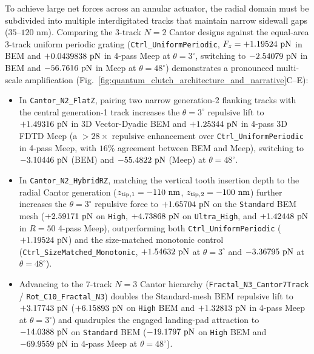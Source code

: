 \documentclass[11pt,letterpaper]{article}
\begin{document}
To achieve large net forces across an annular actuator, the radial domain must be subdivided into multiple interdigitated tracks that maintain narrow sidewall gaps ($35\text{--}120\text{ nm}$). Comparing the 3-track $N=2$ Cantor designs against the equal-area 3-track uniform periodic grating (\texttt{Ctrl\_UniformPeriodic}, $F_z = +1.19524{}\text{ pN}$ in BEM and $+0.0439838{}\text{ pN}$ in 4-pass Meep at $\theta=3^\circ$, switching to $-2.54079{}\text{ pN}$ in BEM and $-56.7616{}\text{ pN}$ in Meep at $\theta=48^\circ$) demonstrates a pronounced multi-scale amplification (Fig.~\ref{fig:quantum_clutch_architecture_and_narrative}C--E):
\begin{itemize}
    \item In \texttt{Cantor\_N2\_FlatZ}, pairing two narrow generation-2 flanking tracks with the central generation-1 track increases the $\theta=3^\circ$ repulsive lift to $+1.49316{}\text{ pN}$ in 3D Vector-Dyadic BEM and $+1.25344{}\text{ pN}$ in 4-pass 3D FDTD Meep (a $>28\times$ repulsive enhancement over \texttt{Ctrl\_UniformPeriodic} in 4-pass Meep, with $16\%$ agreement between BEM and Meep), switching to $-3.10446{}\text{ pN}$ (BEM) and $-55.4822{}\text{ pN}$ (Meep) at $\theta=48^\circ$.
    \item In \texttt{Cantor\_N2\_HybridRZ}, matching the vertical tooth insertion depth to the radial Cantor generation ($z_{\rm tip,1} = -110\text{ nm}$, $z_{\rm tip,2} = -100\text{ nm}$) further increases the $\theta=3^\circ$ repulsive force to $+1.65704{}\text{ pN}$ on the \texttt{Standard} BEM mesh ($+2.59171{}\text{ pN}$ on \texttt{High}, $+4.73868{}\text{ pN}$ on \texttt{Ultra\_High}, and $+1.42448{}\text{ pN}$ in $R=50$ 4-pass Meep), outperforming both \texttt{Ctrl\_UniformPeriodic} ($+1.19524{}\text{ pN}$) and the size-matched monotonic control (\texttt{Ctrl\_SizeMatched\_Monotonic}, $+1.54632{}\text{ pN}$ at $\theta=3^\circ$ and $-3.36795{}\text{ pN}$ at $\theta=48^\circ$).
    \item Advancing to the 7-track $N=3$ Cantor hierarchy (\texttt{Fractal\_N3\_Cantor7Track} / \texttt{Rot\_C10\_Fractal\_N3}) doubles the Standard-mesh BEM repulsive lift to $+3.17743{}\text{ pN}$ ($+6.15893{}\text{ pN}$ on \texttt{High} BEM and $+1.32813{}\text{ pN}$ in 4-pass Meep at $\theta=3^\circ$) and quadruples the engaged landing-pad attraction to $-14.0388{}\text{ pN}$ on \texttt{Standard} BEM ($-19.1797{}\text{ pN}$ on \texttt{High} BEM and $-69.9559{}\text{ pN}$ in 4-pass Meep at $\theta=48^\circ$).
\end{itemize}
\end{document}
